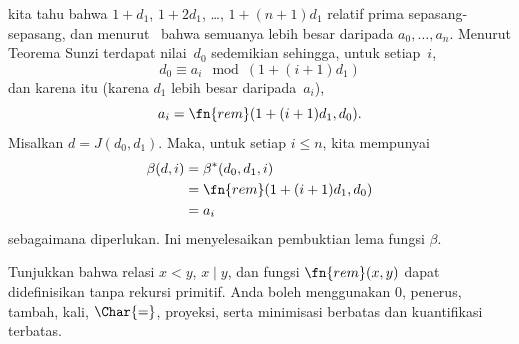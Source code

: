 \documentclass[../../../include/open-logic-section]{subfiles}
\begin{document}
kita tahu bahwa $1+d_1$, $1+2 d_1$, \dots, $1+(n+1) d_1$ relatif prima
sepasang-sepasang, dan menurut~ bahwa semuanya lebih besar
daripada $a_0,\dots,a_n$. Menurut Teorema Sunzi terdapat nilai~$d_0$
sedemikian sehingga, untuk setiap~$i$,
\[
d_0 \equiv a_i \mod (1+(i+1)d_1)
\]
dan karena itu (karena $d_1$ lebih besar daripada~$a_i$),
\[
a_i = \fn{rem}(1+(i+1)d_1,d_0).
\]
Misalkan $d = J(d_0,d_1)$. Maka, untuk setiap $i \le n$, kita mempunyai
\begin{align*}
\beta(d,i) & =  \beta^*(d_0,d_1,i) \\
& =  \fn{rem}(1+(i+1) d_1,d_0) \\
& =  a_i
\end{align*}
sebagaimana diperlukan. Ini menyelesaikan pembuktian lema fungsi $\beta$.

\begin{prob}
  Tunjukkan bahwa relasi $x < y$, $x \mid y$, dan fungsi
  $\fn{rem}(x,y)$ dapat didefinisikan tanpa rekursi primitif. Anda boleh
  menggunakan $0$, penerus, tambah, kali, $\Char{=}$, proyeksi, serta
  minimisasi berbatas dan kuantifikasi terbatas.
\end{prob}
\end{document}
